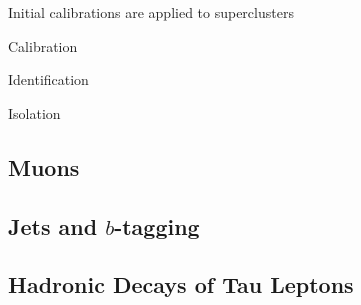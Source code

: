 Initial calibrations are applied to superclusters

Calibration

Identification

Isolation




\subsection{Muons}%
\label{sec:muon_rec}

\subsection{Jets and $b$-tagging}%
\label{sec:jet_rec}

\subsection{Hadronic Decays of Tau Leptons}%
\label{sec:tau_rec}


